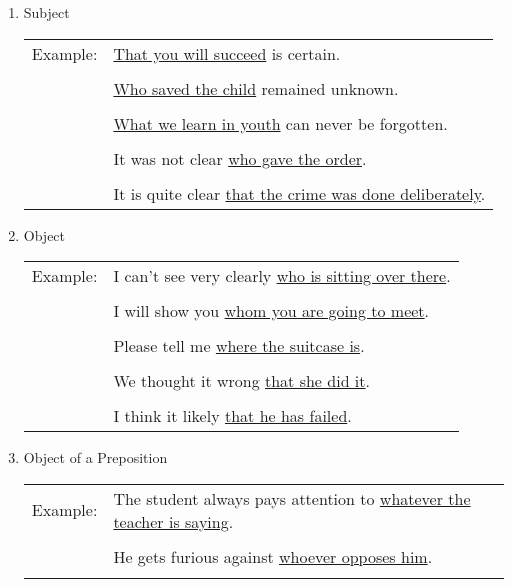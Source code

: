 \begin{enumerate}
    \item Subject
        \newline
        \begin{tabular}{ll}
            Example:
            & \underline{That you will succeed} is certain.
            \\ \\
            & \underline{Who saved the child} remained unknown.
            \\ \\
            & \underline{What we learn in youth} can never be forgotten.
            \\ \\
            & It was not clear \underline{who gave the order}.
            \\ \\
            & It is quite clear \underline{that the crime was done
            deliberately}.
        \end{tabular}
    \item Object
        \newline
        \begin{tabular}{ll}
            Example:
            & I can't see very clearly \underline{who is sitting over there}.
            \\ \\
            & I will show you \underline{whom you are going to meet}.
            \\ \\
            & Please tell me \underline{where the suitcase is}.
            \\ \\
            & We thought it wrong \underline{that she did it}.
            \\ \\
            & I think it likely \underline{that he has failed}.
        \end{tabular}
    \item Object of a Preposition
        \newline
        \begin{tabular}{ll}
            Example:
            & The student always pays attention to \underline{whatever the
            teacher is saying}.
            \\ \\
            & He gets furious against \underline{whoever opposes him}.
            \\ \\

\end{tabular}
\end{enumerate}
